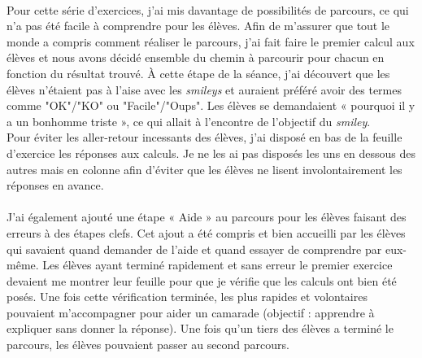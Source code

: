 \paragraph{}Pour cette série d'exercices, j'ai mis davantage de possibilités de parcours, ce qui n'a pas été facile à comprendre pour les élèves. Afin de m'assurer que tout le monde a compris comment réaliser le parcours, j'ai fait faire le premier calcul aux élèves et nous avons décidé ensemble du chemin à parcourir pour chacun en fonction du résultat trouvé. À cette étape de la séance, j'ai découvert que les élèves n'étaient pas à l'aise avec les \textit{smileys} et auraient préféré avoir des termes comme "OK"/"KO" ou "Facile"/"Oups". Les élèves se demandaient « pourquoi il y a un bonhomme triste », ce qui allait à l'encontre de l'objectif du \textit{smiley}.\\
Pour éviter les aller-retour incessants des élèves, j'ai disposé en bas de la feuille d'exercice les réponses aux calculs. Je ne les ai pas disposés les uns en dessous des autres mais en colonne afin d'éviter que les élèves ne lisent involontairement les réponses en avance.
\paragraph{}J'ai également ajouté une étape « Aide » au parcours pour les élèves faisant des erreurs à des étapes clefs. Cet ajout a été compris et bien accueilli par les élèves qui savaient quand demander de l'aide et quand essayer de comprendre par eux-même. Les élèves ayant terminé rapidement et sans erreur le premier exercice devaient me montrer leur feuille pour que je vérifie que les calculs ont bien été posés. Une fois cette vérification terminée, les plus rapides et volontaires pouvaient m'accompagner pour aider un camarade (objectif : apprendre à expliquer sans donner la réponse). Une fois qu'un tiers des élèves a terminé le parcours, les élèves pouvaient passer au second parcours.
